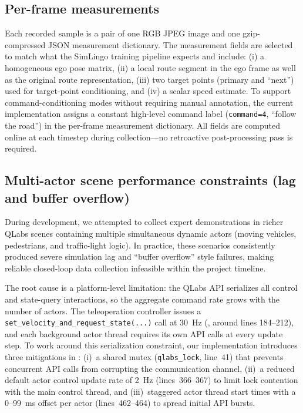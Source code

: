 \subsection{Per-frame measurements}
\label{sec:measurements}
Each recorded sample is a pair of one RGB JPEG image and one gzip-compressed JSON measurement dictionary. The measurement fields are selected to match what the SimLingo training pipeline expects and include: (i) a homogeneous ego pose matrix, (ii) a local route segment in the ego frame as well as the original route representation, (iii) two target points (primary and ``next'') used for target-point conditioning, and (iv) a scalar speed estimate. To support command-conditioning modes without requiring manual annotation, the current implementation assigns a constant high-level command label (\texttt{command=4}, ``follow the road'') in the per-frame measurement dictionary. All fields are computed online at each timestep during collection---no retroactive post-processing pass is required.

\subsection{Multi-actor scene performance constraints (lag and buffer overflow)}
\label{sec:multi-actor-constraints}
During development, we attempted to collect expert demonstrations in richer QLabs scenes containing multiple simultaneous dynamic actors (moving vehicles, pedestrians, and traffic-light logic). In practice, these scenarios consistently produced severe simulation lag and ``buffer overflow'' style failures, making reliable closed-loop data collection infeasible within the project timeline.

The root cause is a platform-level limitation: the QLabs API serializes all control and state-query interactions, so the aggregate command rate grows with the number of actors. The teleoperation controller issues a \texttt{set\_velocity\_and\_request\_state(...)} call at \SI{30}{Hz} (, around lines 184--212), and each background actor thread requires its own API calls at every update step. To work around this serialization constraint, our implementation introduces three mitigations in : (i)~a shared mutex (\texttt{qlabs\_lock}, line~41) that prevents concurrent API calls from corrupting the communication channel, (ii)~a reduced default actor control update rate of \SI{2}{Hz} (lines~366--367) to limit lock contention with the main control thread, and (iii)~staggered actor thread start times with a 0--99~ms offset per actor (lines~462--464) to spread initial API bursts.

